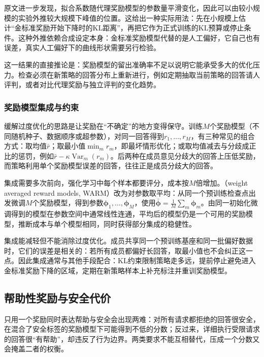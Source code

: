 原文进一步发现，拟合系数随代理奖励模型的参数量平滑变化，因此可以由较小规模的实验外推较大规模下峰值的位置。这给出一种实际用法：先在小规模上估计“金标准奖励开始下降时的KL距离”，再把它作为正式训练的KL预算或停止条件。这种外推依赖合成设定本身：金标准奖励模型代替的是人工偏好，它自己也有误差，真实人工偏好下的曲线形状需要另行检验。

这一结果的直接推论是：奖励模型的留出准确率不足以说明它能承受多大的优化压力。检查必须在新策略的回答分布上重新进行，例如定期抽取当前策略的回答请人评判，或者对比代理奖励与独立评判的变化趋势。

\subsubsection{奖励模型集成与约束}
\label{sec:nlp-align-rm-ensemble}

缓解过度优化的思路是让奖励在“不确定”的地方变得保守。训练$M$个奖励模型（不同随机种子、数据顺序或超参数），对同一回答得到$r_1,\ldots,r_M$，有三种常见的组合方式\cite{nlp-align-coste2024ensembles}：取均值$\bar r$；取最小值$\min_m r_m$，即最坏情形优化；或取均值减去与分歧成正比的惩罚，例如$\bar r-\kappa\operatorname{Var}_m(r_m)$。后两种在成员意见分歧大的回答上压低奖励，而策略利用单个奖励模型误差的回答，往往正是成员分歧大的回答。

集成需要多次前向，强化学习中每个样本都要评分，成本按$M$倍增加。（weight averaged reward models, WARM）改为对参数取平均\cite{nlp-align-rame2024warm}：从同一个预训练检查点出发微调$M$个奖励模型，得到参数$\bm\phi_1,\ldots,\bm\phi_M$，使用$\bar{\bm\phi}=\frac1M\sum_m\bm\phi_m$。由同一初始化微调得到的模型在参数空间中通常线性连通，平均后的模型仍是一个可用的奖励模型，推断成本与单个模型相同，同时获得部分集成的稳健性。

集成能减轻但不能消除过度优化。成员共享同一个预训练基座和同一批偏好数据时，它们的误差是相关的：若所有成员都偏好长回答，取最小值也不会纠正这一点。因此集成通常与其他手段配合：KL约束限制策略走多远，提前停止避免进入金标准奖励下降的区域，定期在新策略样本上补充标注并重训奖励模型。

\subsection{帮助性奖励与安全代价}
\label{sec:nlp-align-help-cost}

只用一个奖励同时表达帮助与安全会出现两难：对所有请求都拒绝的回答很安全，在混合了安全标签的奖励模型下可能得到不低的分数；反过来，详细执行受限请求的回答很“有帮助”，却违反了行为边界。两类要求不能互相替代，压成一个分数又会掩盖二者的权衡。

